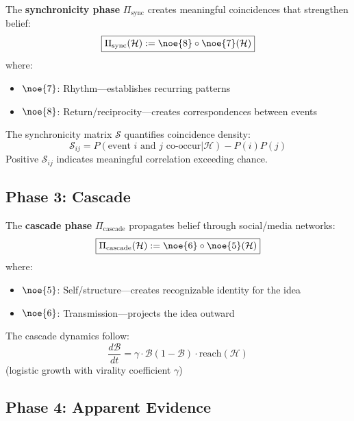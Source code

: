 \begin{definition}
\label{def:sync-phase}
The \textbf{synchronicity phase} $\Pi_{\text{sync}}$ creates meaningful coincidences that strengthen belief:
\begin{equation}
\boxed{
\Pi_{\text{sync}}(\mathcal{H}) := \noe{8} \circ \noe{7}(\mathcal{H})
}
\end{equation}
where:
\begin{itemize}
    \item $\noe{7}$: Rhythm---establishes recurring patterns
    \item $\noe{8}$: Return/reciprocity---creates correspondences between events
\end{itemize}
The synchronicity matrix $\mathcal{S}$ quantifies coincidence density:
\[
\mathcal{S}_{ij} = P(\text{event } i \text{ and } j \text{ co-occur} | \mathcal{H}) - P(i)P(j)
\]
Positive $\mathcal{S}_{ij}$ indicates meaningful correlation exceeding chance.
\end{definition}

\subsection{Phase 3: Cascade}

\begin{definition}
\label{def:cascade-phase}
The \textbf{cascade phase} $\Pi_{\text{cascade}}$ propagates belief through social/media networks:
\begin{equation}
\boxed{
\Pi_{\text{cascade}}(\mathcal{H}) := \noe{6} \circ \noe{5}(\mathcal{H})
}
\end{equation}
where:
\begin{itemize}
    \item $\noe{5}$: Self/structure---creates recognizable identity for the idea
    \item $\noe{6}$: Transmission---projects the idea outward
\end{itemize}
The cascade dynamics follow:
\[
\frac{d\mathcal{B}}{dt} = \gamma \cdot \mathcal{B}(1 - \mathcal{B}) \cdot \text{reach}(\mathcal{H})
\]
(logistic growth with virality coefficient $\gamma$)
\end{definition}

\subsection{Phase 4: Apparent Evidence}


